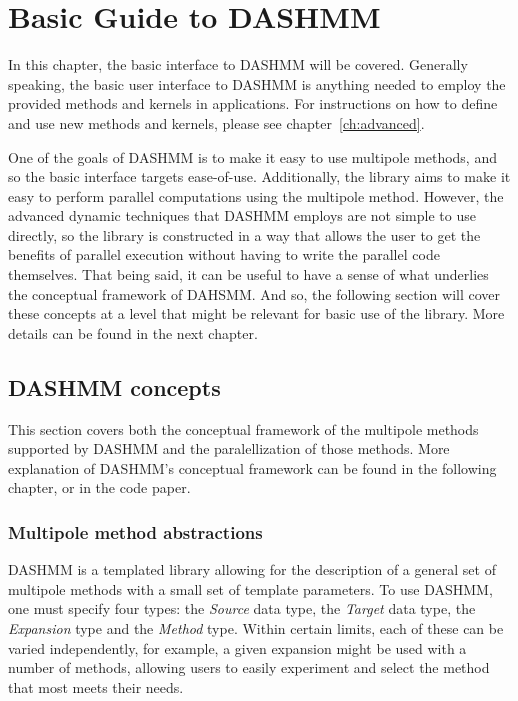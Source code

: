 \chapter{Basic Guide to DASHMM}
\label{ch:basic}

In this chapter, the basic interface to DASHMM will be
covered. Generally speaking, the basic user interface to DASHMM is
anything needed to employ the provided methods and kernels in
applications. For instructions on how to define and use new methods and
kernels, please see chapter~\ref{ch:advanced}.

One of the goals of DASHMM is to make it easy to use multipole
methods, and so the basic interface targets ease-of-use. Additionally,
the library aims to make it easy to perform parallel computations
using the multipole method. However, the advanced dynamic techniques
that DASHMM employs are not simple to use directly, so the library is
constructed in a way that allows the user to get the benefits of
parallel execution without having to write the parallel code
themselves. That being said, it can be useful to have a sense of what
underlies the conceptual framework of DAHSMM. And so, the following
section will cover these concepts at a level that might be relevant
for basic use of the library. More details can be found in the next
chapter.

\section{DASHMM concepts}
This section covers both the conceptual framework of the multipole
methods supported by DASHMM and the paralellization of those
methods. More explanation of DASHMM's conceptual framework can be
found in the following chapter, or in the code paper.

\subsection{Multipole method abstractions}

DASHMM is a templated library allowing for the description of a
general set of multipole methods with a small set of template
parameters. To use DASHMM, one must specify four types: the {\it Source}
data type, the {\it Target} data type, the {\it Expansion} type and
the {\it Method} type. Within certain limits, each of these can be
varied independently, for example, a given expansion might be used
with a number of methods, allowing users to easily experiment and
select the method that most meets their needs.

